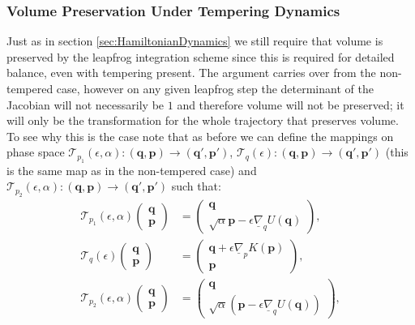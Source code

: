 \documentclass[12pt]{article}
\begin{document}
    \subsubsection{Volume Preservation Under Tempering Dynamics}
    \label{sec:VPUnderTempering}
    Just as in section \ref{sec:HamiltonianDynamics} we still require that volume is preserved by the leapfrog integration scheme since this is required for detailed balance, even with tempering present. The argument carries over from the non-tempered case, however on any given leapfrog step the determinant of the Jacobian will not necessarily be $1$ and therefore volume will not be preserved; it will only be the transformation for the whole trajectory that preserves volume. To see why this is the case note that as before we can define the mappings on phase space $\mathcal{T}_{p_1}\left(\epsilon,\alpha\right): \left(\bm{q},\bm{p}\right) \rightarrow \left(\bm{q}',\bm{p}'\right)$, $\mathcal{T}_{q}\left(\epsilon\right): \left(\bm{q},\bm{p}\right) \rightarrow \left(\bm{q}',\bm{p}'\right)$ (this is the same map as in the non-tempered case) and $\mathcal{T}_{p_2}\left(\epsilon,\alpha\right): \left(\bm{q},\bm{p}\right) \rightarrow \left(\bm{q}',\bm{p}'\right)$ such that:
    \begin{align}
        \mathcal{T}_{p_1}\left(\epsilon,\alpha\right)\begin{pmatrix} \bm{q} \\ \bm{p} \end{pmatrix} & = \begin{pmatrix} \bm{q} \\ \sqrt{\alpha}\bm{p} - \epsilon \underline{\nabla}_{q}U\left(\bm{q}\right)\end{pmatrix},\\
        \mathcal{T}_{q}\left(\epsilon\right)\begin{pmatrix} \bm{q} \\ \bm{p} \end{pmatrix} & = \begin{pmatrix} \bm{q} + \epsilon \underline{\nabla}_pK\left(\bm{p}\right)  \\ \bm{p} \end{pmatrix},\\
        \mathcal{T}_{p_2}\left(\epsilon,\alpha\right)\begin{pmatrix} \bm{q} \\ \bm{p} \end{pmatrix} & = \begin{pmatrix} \bm{q} \\ \sqrt{\alpha}\left(\bm{p} - \epsilon \underline{\nabla}_qU\left(\bm{q}\right)\right)\end{pmatrix},
    \end{align}
\end{document}
